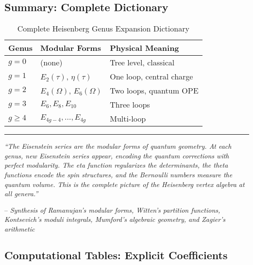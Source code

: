 \subsection{Summary: Complete Dictionary}
\label{subsec:heisenberg-dictionary-complete}

\begin{table}[h]
\centering
\caption{Complete Heisenberg Genus Expansion Dictionary}
\label{tab:heisenberg-complete-dictionary}
\begin{tabular}{|l|l|l|}
\hline
\textbf{Genus} & \textbf{Modular Forms} & \textbf{Physical Meaning} \\
\hline
$g=0$ & (none) & Tree level, classical \\
\hline
$g=1$ & $E_2(\tau)$, $\eta(\tau)$ & One loop, central charge \\
\hline
$g=2$ & $E_4(\Omega)$, $E_6(\Omega)$ & Two loops, quantum OPE \\
\hline
$g=3$ & $E_6, E_8, E_{10}$ & Three loops \\
\hline
$g \geq 4$ & $E_{4g-4}, \ldots, E_{4g}$ & Multi-loop \\
\hline
\end{tabular}
\end{table}

\begin{center}
\rule{0.5\textwidth}{0.4pt}

\textit{``The Eisenstein series are the modular forms of quantum geometry. At each 
genus, new Eisenstein series appear, encoding the quantum corrections with perfect 
modularity. The eta function regularizes the determinants, the theta functions encode 
the spin structures, and the Bernoulli numbers measure the quantum volume. This is 
the complete picture of the Heisenberg vertex algebra at all genera.''}

-- \textit{Synthesis of Ramanujan's modular forms, Witten's partition functions, \\
Kontsevich's moduli integrals, Mumford's algebraic geometry, and Zagier's arithmetic}
\end{center}

\subsection{Computational Tables: Explicit Coefficients}
\label{subsec:explicit-coefficients-tables}

